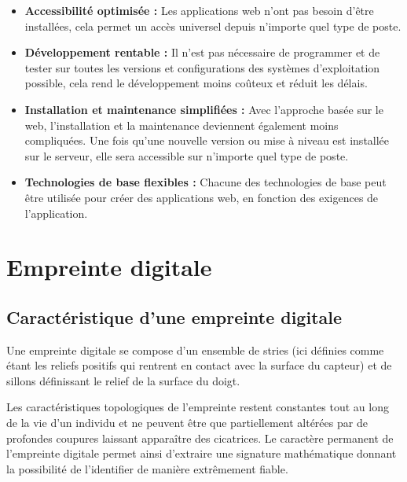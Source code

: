 \begin{itemize}
    \item[\textbullet] \textbf{Accessibilité optimisée :} Les
        applications web n’ont pas besoin d’être installées, cela permet
        un accès universel depuis n’importe quel type de poste.
    
    \item[\textbullet] \textbf{Développement rentable :} Il n'est pas
        nécessaire de programmer et de tester sur toutes les versions et
        configurations des systèmes d'exploitation possible, cela rend
        le développement moins coûteux et réduit les délais.
    
     \item[\textbullet] \textbf{Installation et maintenance simplifiées :}
        Avec l'approche basée sur le web, l'installation et la
        maintenance deviennent également moins compliquées. Une fois
        qu'une nouvelle version ou mise à niveau est installée sur le
        serveur, elle sera accessible sur n'importe quel type de poste.
    
    \item[\textbullet] \textbf{Technologies de base flexibles :} Chacune
        des technologies de base peut être utilisée pour créer des
        applications web, en fonction des exigences de
        l'application.\cite{2}
\end{itemize}
        
   
\section{Empreinte digitale}
\subsection{Caractéristique d’une empreinte digitale}
Une empreinte digitale se compose d’un ensemble de stries (ici définies comme
étant les reliefs positifs qui rentrent en contact avec la surface du capteur)
et de sillons définissant le relief de la surface du doigt. 
            
Les caractéristiques topologiques de l’empreinte restent constantes tout au long
de la vie d’un individu et ne peuvent être que partiellement altérées par de
profondes coupures laissant apparaître des cicatrices. Le caractère permanent de
l’empreinte digitale permet ainsi d’extraire une signature mathématique donnant
la possibilité de l’identifier de manière extrêmement fiable.\cite{3}
        
